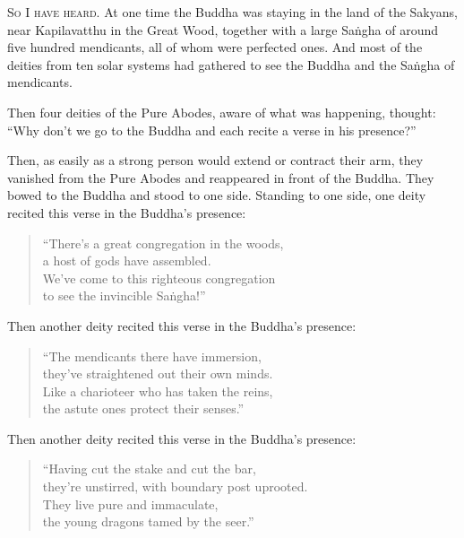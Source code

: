 \documentclass[12pt,openany]{book}%
\newcommand*{\scevam}[1]{\textsc{#1}}
\begin{document}
\scevam{So I have heard. }At one time the Buddha was staying in the land of the Sakyans, near Kapilavatthu in the Great Wood, together with a large \textsanskrit{Saṅgha} of around five hundred mendicants, all of whom were perfected ones. And most of the deities from ten solar systems had gathered to see the Buddha and the \textsanskrit{Saṅgha} of mendicants. 

Then four deities of the Pure Abodes, aware of what was happening, thought: “Why don’t we go to the Buddha and each recite a verse in his presence?” 

Then, as easily as a strong person would extend or contract their arm, they vanished from the Pure Abodes and reappeared in front of the Buddha. They bowed to the Buddha and stood to one side. Standing to one side, one deity recited this verse in the Buddha’s presence: 

\begin{verse}%
“There’s a great congregation in the woods, \\
a host of gods have assembled. \\
We’ve come to this righteous congregation \\
to see the invincible \textsanskrit{Saṅgha}!” 

%
\end{verse}

Then another deity recited this verse in the Buddha’s presence: 

\begin{verse}%
“The mendicants there have immersion, \\
they’ve straightened out their own minds. \\
Like a charioteer who has taken the reins, \\
the astute ones protect their senses.” 

%
\end{verse}

Then another deity recited this verse in the Buddha’s presence: 

\begin{verse}%
“Having cut the stake and cut the bar, \\
they’re unstirred, with boundary post uprooted. \\
They live pure and immaculate, \\
the young dragons tamed by the seer.” 

%
\end{verse}
\end{document}
